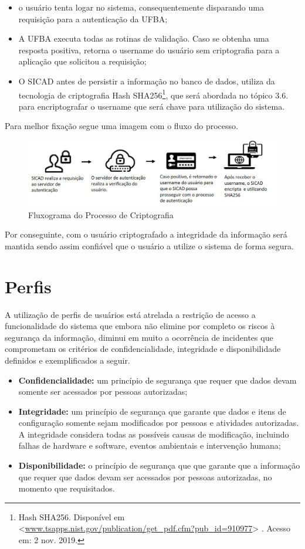 \documentclass[12pt, a4paper]{report}
\begin{document}
\begin{itemize}
\item o usuário tenta logar no sistema, consequentemente disparando uma requisição para a autenticação da UFBA;
\item A UFBA executa todas as rotinas de validação.
Caso se obtenha uma resposta positiva, retorna o username do usuário sem criptografia para a aplicação que solicitou a requisição;
\item O SICAD antes de persistir a informação no banco de dados, utiliza da tecnologia de criptografia Hash SHA256\footnote{Hash SHA256. Disponível em <\url{www.tsapps.nist.gov/publication/get_pdf.cfm?pub_id=910977}> . Acesso em: 2 nov. 2019.}, que será abordada no tópico 3.6. para encriptografar o username que será chave para utilização do sistema.
\end{itemize}
\par Para melhor fixação segue uma imagem com o fluxo do processo.
\begin{figure}[ht]
\centering
\includegraphics[scale=0.80]{fluxograma_criptografia.jpg}
\caption{Fluxograma do Processo de Criptografia}
\label{fig:processo_autenticacao}
\end{figure}
\par Por conseguinte, com o usuário criptografado a integridade da informação será mantida sendo assim confiável que o usuário a utilize o sistema de forma segura.

\section{ Perfis}
\par
A utilização de perfis de usuários está atrelada a restrição de acesso a funcionalidade do sistema que embora não elimine por completo os riscos à  segurança da informação, diminui em muito a ocorrência de incidentes que comprometam os critérios de confidencialidade, integridade e disponibilidade definidos e exemplificados a seguir.
\begin{itemize}
\item \textbf{Confidencialidade:} um princípio de segurança que requer que dados devam somente ser acessados por pessoas autorizadas;
\item \textbf{Integridade:} um princípio de segurança que garante que dados e itens de configuração somente sejam modificados por pessoas e atividades autorizadas. A integridade considera todas as possíveis causas de modificação, incluindo falhas de hardware e software, eventos ambientais e intervenção humana;
\item \textbf{Disponibilidade:} o princípio de segurança que que garante que a informação que requer que dados devam ser acessados por pessoas autorizadas, no momento que requisitados.
\end{itemize}
\end{document}
